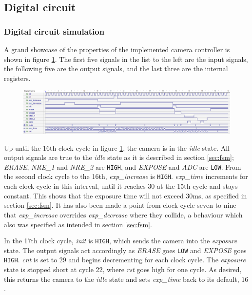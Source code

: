 \subsection{Digital circuit}


\subsubsection{Digital circuit simulation}

A grand showcase of the properties of the implemented camera controller is shown in figure \ref{fig:waveform}. The first five signals in the list to the left are the input signals, the following five are the output signals, and the last three are the internal registers.

\begin{figure}[H]
    \centering
    \includegraphics[width=\textwidth]{graphs/digital_waveform.png}
    \label{fig:waveform}
\end{figure}

Up until the 16th clock cycle in figure \ref{fig:waveform}, the camera is in the \emph{idle} state. All output signals are true to the \emph{idle} state as it is described in section \ref{sec:fsm}; \emph{ERASE}, \emph{NRE\_1} and \emph{NRE\_2} are \verb|HIGH|, and \emph{EXPOSE} and \emph{ADC} are \verb|LOW|. From the second clock cycle to the 16th, \emph{exp\_increase} is \verb|HIGH|. \emph{exp\_time} increments for each clock cycle in this interval, until it reaches $30$ at the 15th cycle and stays constant. This shows that the exposure time will not exceed $30$ms, as specified in section \ref{sec:fsm}. It has also been made a point from clock cycle seven to nine that \emph{exp\_increase} overrides \emph{exp\_decrease} where they collide, a behaviour which also was specified as intended in section \ref{sec:fsm}.

In the 17th clock cycle, \emph{init} is \verb|HIGH|, which sends the camera into the \emph{exposure} state. The output signals act accordingly as \emph{ERASE} goes \verb|LOW| and \emph{EXPOSE} goes \verb|HIGH|. \emph{cnt} is set to $29$ and begins decrementing for each clock cycle. The \emph{exposure} state is stopped short at cycle 22, where \emph{rst} goes high for one cycle. As desired, this returns the camera to the \emph{idle} state and sets \emph{exp\_time} back to its default, $16$.

